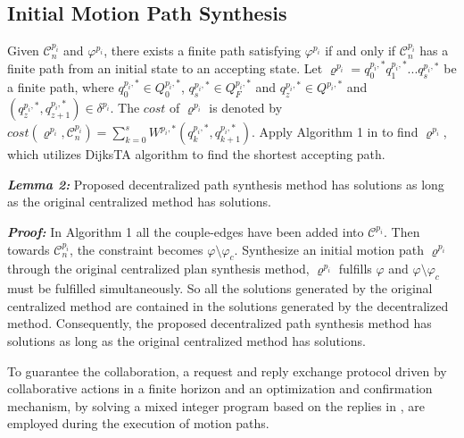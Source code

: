 \documentclass[journal]{IEEEtran}
\begin{document}
\subsection{Initial Motion Path Synthesis}
Given $\mathcal{C}^{p_i}_n$ and $\varphi^{p_i}$, there exists a finite path satisfying $\varphi^{p_i}$ if and only if $\mathcal{C}^{p_i}_n$ has a finite path from an initial state to an accepting state. Let $\varrho^{p_i}=q^{p_i,\ast}_0 q^{p_i,\ast}_1 ... q^{p_i,\ast}_s$ be a finite path, where $q^{p_i,\ast}_0\in Q^{p_i,\ast}_0$, $q^{p_i,\ast}_s\in Q^{p_i,\ast}_F$ and $q^{p_i,\ast}_z\in Q^{p_i,\ast}$ and $(q^{p_i,\ast}_z,q^{p_i,\ast}_{z+1})\in \delta^{p_i}$. The $cost$ of $\varrho^{p_i}$ is denoted by $cost(\varrho^{p_i},\mathcal{C}^{p_i}_n)=\sum^{s}_{k=0}W^{p_i,\ast}(q^{p_i,\ast}_k,q^{p_i,\ast}_{k+1})$. Apply Algorithm 1 in \cite{guo2013motion} to find $\varrho^{p_i}$, which utilizes DijksTA algorithm to find the shortest accepting path.

\textbf{\emph{Lemma 2:}} Proposed decentralized path synthesis method has solutions as long as the original centralized method has solutions.\par
\textbf{\emph{Proof:}} In Algorithm 1 all the couple-edges have been added into $\mathcal{C}^{p_i}$. Then towards $\mathcal{C}^{p_i}_n$, the constraint becomes $\varphi \setminus \varphi_c$. Synthesize an initial motion path $\varrho^{p_i}$ through the original centralized plan synthesis method, $\varrho^{p_i}$ fulfills $\varphi$ and $\varphi \setminus \varphi_c$ must be fulfilled simultaneously. So all the solutions generated by the original centralized method are contained in the solutions generated by the decentralized method. Consequently, the proposed decentralized path synthesis method has solutions as long as the original centralized method has solutions.\par

To guarantee the collaboration, a request and reply exchange protocol driven by
collaborative actions in a finite horizon and an optimization and
confirmation mechanism, by solving a mixed integer program
based on the replies in \cite{guo2017task}, are employed during the execution of motion paths.
%
\end{document}
